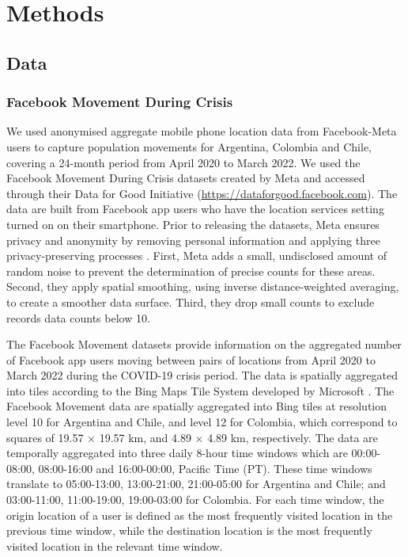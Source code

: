 \documentclass[fleqn,10pt]{wlscirep}
\begin{document}
\section*{Methods}

\subsection*{Data}

\subsubsection*{Facebook Movement During Crisis}

We used anonymised aggregate mobile phone location data from Facebook-Meta users to capture population movements for Argentina, Colombia and Chile, covering a 24-month period from April 2020 to March 2022.
We used the Facebook Movement During Crisis datasets created by Meta and accessed through their Data for Good Initiative (\href{https://dataforgood.facebook.com}{https://dataforgood.facebook.com}).
The data are built from Facebook app users who have the location services setting turned on on their smartphone.
Prior to releasing the datasets, Meta ensures privacy and anonymity by removing personal information and applying three privacy-preserving processes \cite{Maas19}.
First, Meta adds a small, undisclosed amount of random noise to prevent the determination of precise counts for these areas.
Second, they apply spatial smoothing, using inverse distance-weighted averaging, to create a smoother data surface.
Third, they drop small counts to exclude records data counts below 10.

The Facebook Movement datasets provide information on the aggregated number of Facebook app users moving between pairs of locations from April 2020 to March 2022 during the COVID-19 crisis period.
The data is spatially aggregated into tiles according to the Bing Maps Tile System developed by Microsoft \cite{MicrosoftBingMaps}.
The Facebook Movement data are spatially aggregated into Bing tiles at resolution level 10 for Argentina and Chile, and level 12 for Colombia, which correspond to squares of 19.57 $\times$ 19.57 km, and 4.89 $\times$ 4.89 km, respectively. The data are temporally aggregated into three daily 8-hour time windows which are 00:00-08:00, 08:00-16:00 and 16:00-00:00, Pacific Time (PT).
These time windows translate to 05:00-13:00, 13:00-21:00, 21:00-05:00 for Argentina and Chile; and 03:00-11:00, 11:00-19:00, 19:00-03:00 for Colombia.
For each time window, the origin location of a user is defined as the most frequently visited location in the previous time window, while the destination location is the most frequently visited location in the relevant time window.
\end{document}
